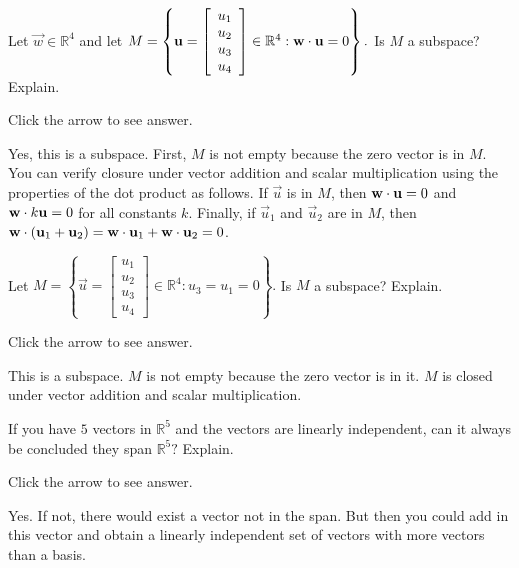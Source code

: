 \documentclass{ximera}
\begin{document}
\begin{problem}\label{prb:5.13} Let $\vec{w}\in \mathbb{R}^{4}$ and let $M=\left\{ \mathbf{u}
=\left[
\begin{array}{c}
u_{1} \\
u_{2} \\
u_{3} \\
u_{4}
\end{array}\right] \in \mathbb{R}^{4}:\mathbf{w}\cdot \mathbf{u}
=0\right\} .$ Is $M$ a subspace? Explain.

Click the arrow to see answer.  
\begin{expandable}
Yes, this is a subspace.  
First, $M$ is not empty because the zero vector is in $M$.  You can verify closure under vector addition and scalar multiplication using the properties of the dot product as follows.  If $\vec{u}$ is in $M$, then $\mathbf{w}\cdot\mathbf{u}=0$ and $\mathbf{w}\cdot k\mathbf{u}=0$ for all constants $k$.  Finally, if $\vec{u}_1$ and $\vec{u}_2$ are in $M$, then $\mathbf{w}\cdot(\mathbf{u}_1+\mathbf{u}_2)=\mathbf{w}\cdot\mathbf{u}_1+\mathbf{w}\cdot\mathbf{u}_2=0$.
\end{expandable}
\end{problem}

\begin{problem}\label{prb:5.15} Let $M=\left\{ \vec{u}=\left[
\begin{array}{c}
u_{1} \\
u_{2} \\
u_{3} \\
u_{4}
\end{array}\right] \in
\mathbb{R}^{4}:u_{3}=u_{1}=0\right\} .$ Is $M$ a subspace? Explain.

Click the arrow to see answer.  
\begin{expandable}
This is a subspace. $M$ is not empty because the zero vector is in it.  $M$ is closed  under vector addition and scalar
multiplication.
\end{expandable}
\end{problem}

\begin{problem}\label{prb:5.24} If you have $5$ vectors in $\mathbb{R}^{5}$ and the vectors are
linearly independent, can it always be concluded they span $\mathbb{R}^{5}?$
Explain.

Click the arrow to see answer.  
\begin{expandable}
 Yes. If not, there would exist a vector not in the span. But then
you could add in this vector and obtain a linearly independent set of
vectors with more vectors than a basis.
\end{expandable}
\end{problem}
\end{document}
